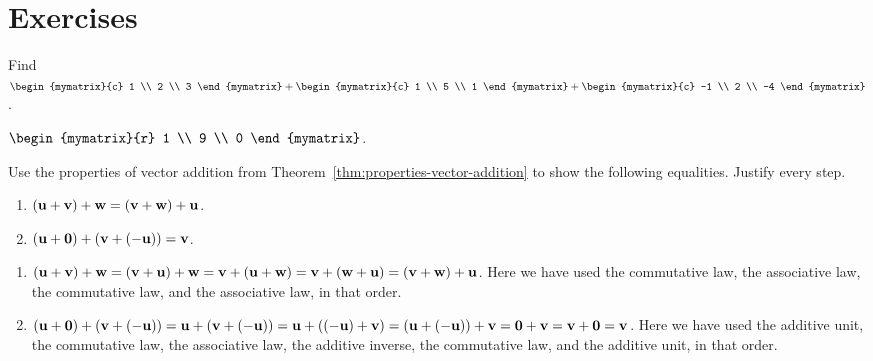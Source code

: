 \section*{Exercises}

\begin{ex}
  Find $\begin{mymatrix}{c}
    1 \\
    2 \\
    3
  \end{mymatrix}
  + \begin{mymatrix}{c}
    1 \\
    5 \\
    1
  \end{mymatrix}
  + \begin{mymatrix}{c}
    -1 \\
    2 \\
    -4
  \end{mymatrix}$.

  \begin{sol}
    $\begin{mymatrix}{r}
      1 \\
      9 \\
      0
    \end{mymatrix}$.
  \end{sol}
\end{ex}

\begin{ex}
  Use the properties of vector addition from
  Theorem~\ref{thm:properties-vector-addition} to show the following
  equalities. Justify every step.
  \begin{enumerate}
  \item $(\vect{u}+\vect{v})+\vect{w} = (\vect{v}+\vect{w})+\vect{u}$.
  \item $(\vect{u}+\vect{0})+(\vect{v}+(-\vect{u})) = \vect{v}$.
  \end{enumerate}

  \begin{sol}
    \begin{enumerate}
    \item
      $(\vect{u}+\vect{v})+\vect{w} = (\vect{v}+\vect{u})+\vect{w} =
      \vect{v}+(\vect{u}+\vect{w}) = \vect{v}+(\vect{w}+\vect{u}) =
      (\vect{v}+\vect{w})+\vect{u}$. Here we have used the commutative
      law, the associative law, the commutative law, and the
      associative law, in that order.
    \item
      $(\vect{u}+\vect{0})+(\vect{v}+(-\vect{u})) =
      \vect{u}+(\vect{v}+(-\vect{u})) = \vect{u}+((-\vect{u})+\vect{v})
      = (\vect{u}+(-\vect{u}))+\vect{v} = \vect{0}+\vect{v} =
      \vect{v}+\vect{0} = \vect{v}$. Here we have used the additive
      unit, the commutative law, the associative law, the additive
      inverse, the commutative law, and the additive unit, in that
      order.
    \end{enumerate}
  \end{sol}
\end{ex}

